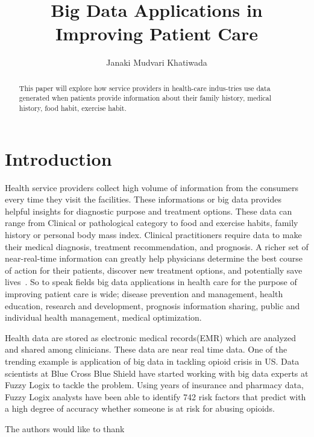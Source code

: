 \documentclass[sigconf]{acmart}
\begin{document}
\title{Big Data Applications in Improving Patient Care}


\author{Janaki Mudvari Khatiwada}
\orcid{}

\renewcommand{\shortauthors}{}


\begin{abstract}
This paper will explore how service providers in health-care indus-tries use data generated when patients provide information about their family history, medical history, food habit, exercise habit.
\end{abstract}

\keywords{}


\maketitle

\section{Introduction}
Health service providers collect high volume of information from the consumers every time they visit the facilities.
These informations or big data provides helpful insights for diagnostic purpose and treatment options. These data can range from Clinical or pathological category to food and exercise habits, family history or personal body mass index.
Clinical practitioners require data to make their medical diagnosis, treatment
recommendation, and prognosis. A richer set of near-real-time information can greatly help
physicians determine the best course of action for their patients, discover new treatment
options, and potentially save lives~\cite{www.hpe}. So to speak fields big data applications in health care for the purpose of improving patient care is wide; disease prevention and management, health education, research and development, prognosis
information sharing, public and individual health management, medical optimization.

Health data are stored as electronic medical records(EMR) which are analyzed and shared among clinicians. These data
are near real time data. One of the trending example is application of big data in tackling opioid crisis in US.
Data scientists at Blue Cross Blue Shield have started working with big data experts at Fuzzy Logix to tackle the problem. Using years of insurance and pharmacy data, Fuzzy Logix analysts have been able to identify 742 risk factors that predict with a high degree of accuracy whether someone is at risk for abusing opioids\cite{Lebied:Example}.

\begin{acks}

  The authors would like to thank 

\end{acks}


 
\end{document}
